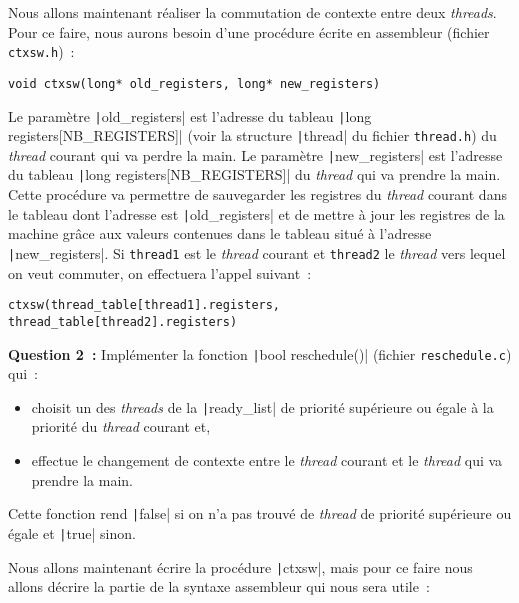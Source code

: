 \documentclass[a4paper]{article}
\begin{document}
Nous allons maintenant réaliser la commutation de contexte entre deux \emph{threads}. Pour ce faire, nous aurons besoin d'une
procédure écrite en assembleur (fichier \verb+ctxsw.h+)~:
\begin{verbatim}
void ctxsw(long* old_registers, long* new_registers)
\end{verbatim}
Le paramètre \texttt|old_registers| est l'adresse du tableau \texttt|long registers[NB_REGISTERS]| (voir la 
structure \texttt|thread| du fichier \verb+thread.h+) du \emph{thread} courant qui va perdre
la main. Le paramètre \texttt|new_registers| est l'adresse du tableau \texttt|long registers[NB_REGISTERS]| du \emph{thread} qui 
va prendre la main.
Cette procédure va permettre de sauvegarder les registres du \emph{thread} courant dans le tableau dont l'adresse est \texttt|old_registers|
et de mettre à jour les registres de la machine grâce aux valeurs contenues dans le tableau situé à l'adresse \texttt|new_registers|.
Si \verb+thread1+ est le \emph{thread} courant et \verb+thread2+ le \emph{thread} vers lequel on veut commuter, on effectuera l'appel suivant~:
\begin{verbatim}
ctxsw(thread_table[thread1].registers, thread_table[thread2].registers)
\end{verbatim}

\textbf{Question 2~:} Implémenter la fonction \texttt|bool reschedule()| (fichier \verb+reschedule.c+) qui~:
\begin{itemize}
\item choisit un des \emph{threads} de la \texttt|ready_list| de priorité supérieure ou égale
à la priorité du \emph{thread} courant et,
\item effectue le changement de contexte entre le \emph{thread} courant et le \emph{thread} qui va prendre la main.
\end{itemize}
Cette fonction rend \texttt|false| si on n'a pas trouvé de \emph{thread} de priorité supérieure ou égale et \texttt|true| sinon.

\vspace{1cm}

Nous allons maintenant écrire la procédure \texttt|ctxsw|, mais pour ce faire nous allons décrire la partie de la syntaxe
assembleur qui nous sera utile~:
\end{document}
